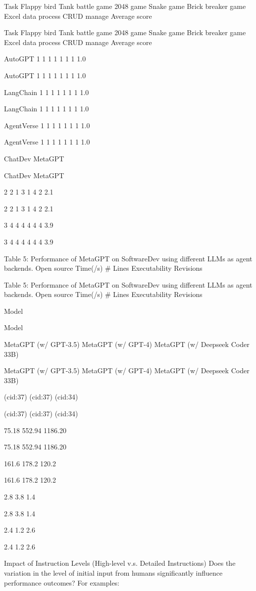 \documentclass[12pt]{article}
\begin{document}
Task
Flappy bird
Tank battle game
2048 game
Snake game
Brick breaker game
Excel data process
CRUD manage
Average score


Task
Flappy bird
Tank battle game
2048 game
Snake game
Brick breaker game
Excel data process
CRUD manage
Average score


AutoGPT
1
1
1
1
1
1
1
1.0


AutoGPT
1
1
1
1
1
1
1
1.0


LangChain
1
1
1
1
1
1
1
1.0


LangChain
1
1
1
1
1
1
1
1.0


AgentVerse
1
1
1
1
1
1
1
1.0


AgentVerse
1
1
1
1
1
1
1
1.0


ChatDev MetaGPT


ChatDev MetaGPT


2
2
1
3
1
4
2
2.1


2
2
1
3
1
4
2
2.1


3
4
4
4
4
4
4
3.9


3
4
4
4
4
4
4
3.9


Table 5: Performance of MetaGPT on SoftwareDev using different LLMs as agent backends.
Open source Time(/s) # Lines Executability Revisions


Table 5: Performance of MetaGPT on SoftwareDev using different LLMs as agent backends.
Open source Time(/s) \# Lines Executability Revisions


Model


Model


MetaGPT (w/ GPT-3.5)
MetaGPT (w/ GPT-4)
MetaGPT (w/ Deepseek Coder 33B)


MetaGPT (w/ GPT-3.5)
MetaGPT (w/ GPT-4)
MetaGPT (w/ Deepseek Coder 33B)


(cid:37)
(cid:37)
(cid:34)


(cid:37)
(cid:37)
(cid:34)


75.18
552.94
1186.20


75.18
552.94
1186.20


161.6
178.2
120.2


161.6
178.2
120.2


2.8
3.8
1.4


2.8
3.8
1.4


2.4
1.2
2.6


2.4
1.2
2.6


Impact of Instruction Levels (High-level v.s. Detailed Instructions) Does the variation in the
level of initial input from humans significantly influence performance outcomes? For examples:
\end{document}
